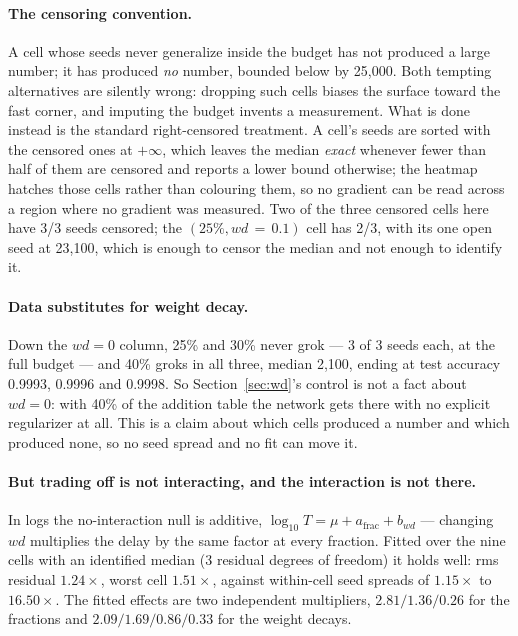 \documentclass[11pt]{article}
\begin{document}
\paragraph{The censoring convention.} A cell whose seeds never generalize
inside the budget has not produced a large number; it has produced \emph{no}
number, bounded below by 25{,}000. Both tempting alternatives are silently
wrong: dropping such cells biases the surface toward the fast corner, and
imputing the budget invents a measurement. What is done instead is the standard
right-censored treatment. A cell's seeds are sorted with the censored ones at
$+\infty$, which leaves the median \emph{exact} whenever fewer than half of
them are censored and reports a lower bound otherwise; the heatmap hatches
those cells rather than colouring them, so no gradient can be read across a
region where no gradient was measured. Two of the three censored cells here
have 3/3 seeds censored; the $(25\%, wd\,{=}\,0.1)$ cell has 2/3, with its
one open seed at 23{,}100, which is enough to censor the median and not enough
to identify it.

\paragraph{Data substitutes for weight decay.} Down the $wd = 0$ column, 25\%
and 30\% never grok --- 3 of 3 seeds each, at the full budget --- and 40\%
groks in all three, median 2{,}100, ending at test accuracy 0.9993, 0.9996 and
0.9998. So Section~\ref{sec:wd}'s control is not a fact about $wd = 0$: with
40\% of the addition table the network gets there with no explicit regularizer
at all. This is a claim about which cells produced a number and which produced
none, so no seed spread and no fit can move it.

\paragraph{But trading off is not interacting, and the interaction is not
there.} In logs the no-interaction null is additive,
$\log_{10} T = \mu + a_{\text{frac}} + b_{wd}$ --- changing $wd$ multiplies
the delay by the same factor at every fraction. Fitted over the nine cells with
an identified median (3 residual degrees of freedom) it holds well: rms
residual $1.24\times$, worst cell $1.51\times$, against within-cell seed
spreads of $1.15\times$ to $16.50\times$. The fitted effects are two
independent multipliers, $2.81 / 1.36 / 0.26$ for the fractions and
$2.09 / 1.69 / 0.86 / 0.33$ for the weight decays.
\end{document}
